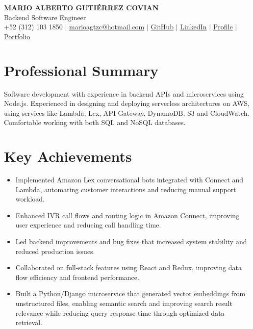 \documentclass[10pt,letterpaper]{article}
\begin{document}
\begin{center}
    {\Large \bfseries \color{darkgray} MARIO ALBERTO GUTIÉRREZ COVIAN}\\[2pt]
    {Backend Software Engineer}\\[4pt]
    \small
    +52 (312) 103 1850 \;$\vert$\;
    \href{mailto:marioagtzc@hotmail.com}{marioagtzc@hotmail.com} \;$\vert$\;
    \href{https://github.com/MarioAGtzC}{GitHub} \;$\vert$\;
    \href{https://www.linkedin.com/in/marioagtz/}{LinkedIn} \;$\vert$\;
    \href{https://mario-gutierrez.com/}{Profile} \;$\vert$\;
    \href{https://portfolio.mario-gutierrez.com/}{Portfolio}
\end{center}

\section*{Professional Summary}
Software development with experience in backend APIs and microservices using Node.js. Experienced in designing and deploying serverless architectures on AWS, using services like Lambda, Lex, API Gateway, DynamoDB, S3 and CloudWatch. Comfortable working with both SQL and NoSQL databases.

\section*{Key Achievements}
\begin{itemize}
    \item Implemented Amazon Lex conversational bots integrated with Connect and Lambda, automating customer interactions and reducing manual support workload.
    \item Enhanced IVR call flows and routing logic in Amazon Connect, improving user experience and reducing call handling time.
    \item Led backend improvements and bug fixes that increased system stability and reduced production issues.
    \item Collaborated on full-stack features using React and Redux, improving data flow efficiency and frontend performance.
    \item Built a Python/Django microservice that generated vector embeddings from unstructured files, enabling semantic search and improving search result relevance while reducing query response time through optimized data retrieval.
\end{itemize}
\end{document}
